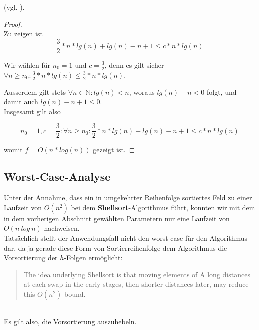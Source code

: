 {(vgl. \cite[11]{GD18a}).

\begin{proof}\label{pr:nlogn}
    \\
Zu zeigen ist
\begin{equation}
\frac{3}{2} * n * lg(n) + lg(n) - n + 1 \leq c * n * lg(n)
\end{equation}

Wir wählen für $n_0 = 1$  und $c = \frac{3}{2}$, denn es gilt sicher $\forall n \geq n_0: \frac{3}{2} * n * lg(n)  \leq \frac{3}{2} * n * lg(n)$.

Ausserdem gilt stets $\forall n \in \mathbb{N}: lg(n) < n$, woraus $lg(n) - n < 0$ folgt, und damit auch $lg(n) - n + 1 \leq 0$.
\\
Insgesamt gilt also

\begin{equation}
n_0 = 1, c = \frac{3}{2}: \forall n \geq n_0: \frac{3}{2} * n * lg(n) + lg(n) - n + 1 \leq c * n * lg(n)
\end{equation}

    womit $f = O(n * log(n))$ gezeigt ist.\square
\end{proof}

\subsection*{Worst-Case-Analyse}

Unter der Annahme, dass ein in umgekehrter Reihenfolge sortiertes Feld zu einer Laufzeit von $O(n^2)$ bei dem \textbf{Shellsort}-Algorithmus führt, konnten wir mit dem in dem vorherigen Abschnitt gewählten Parametern nur eine Laufzeit von $O(n\ log\ n)$ nachweisen.
\\

Tatsächlich stellt der Anwendungsfall nicht den worst-case für den Algorithmus dar, da ja gerade diese Form von Sortierreihenfolge dem Algorithmus die Vorsortierung der $h$-Folgen ermöglicht:
\\
\blockquote[{\cite[3]{Pra72}}]{
    The idea underlying Shellsort is that moving elements of A long
    distances at each swap in the early stages, then shorter distances later,
    may reduce this $O(n^2)$ bound.
}
\\

Es gilt also, die Vorsortierung auszuhebeln.
\\

}
